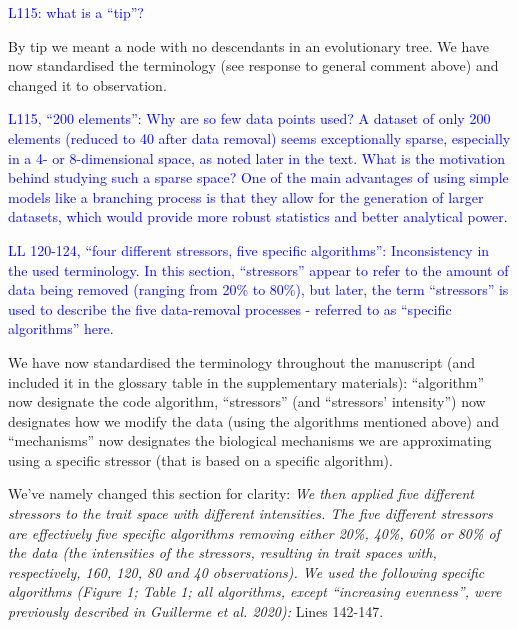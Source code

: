 \documentclass[
]{article}
\begin{document}
\textcolor{blue}{L115: what is a ``tip''?}

By tip we meant a node with no descendants in an evolutionary tree.
We have now standardised the terminology (see response to general comment above) and changed it to observation.

\textcolor{blue}{L115, ``200 elements'': Why are so few data points used? A dataset of only 200 elements (reduced to 40 after data removal) seems exceptionally sparse, especially in a 4- or 8-dimensional space, as noted later in the text.
What is the motivation behind studying such a sparse space? One of the main advantages of using simple models like a branching process is that they allow for the generation of larger datasets, which would provide more robust statistics and better analytical power.}



\textcolor{blue}{LL 120-124, ``four different stressors, five specific algorithms'': Inconsistency in the used terminology.
In this section, ``stressors'' appear to refer to the amount of data being removed (ranging from 20\% to 80\%), but later, the term ``stressors'' is used to describe the five data-removal processes - referred to as ``specific algorithms'' here.}


We have now standardised the terminology throughout the manuscript (and included it in the glossary table in the supplementary materials): ``algorithm'' now designate the code algorithm, ``stressors'' (and ``stressors' intensity'') now designates how we modify the data (using the algorithms mentioned above) and ``mechanisms'' now designates the biological mechanisms we are approximating using a specific stressor (that is based on a specific algorithm).

We've namely changed this section for clarity:
\textit{We then applied five different stressors to the trait space with different intensities.
The five different stressors are effectively five specific algorithms removing either 20\%, 40\%, 60\% or 80\% of the data (the intensities of the stressors, resulting in trait spaces with, respectively, 160, 120, 80 and 40 observations).
We used the following specific algorithms (Figure 1; Table 1; all algorithms, except ``increasing evenness'', were previously described in Guillerme et al. 2020):}
Lines 142-147.
\end{document}
